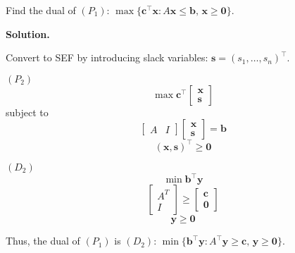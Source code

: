 \begin{exbox}
    \begin{example}[Dual]
        Find the dual of
        $ (P_1)$: $\max \{\bm{c}^\top \bm{x}: A \bm{x}\leqslant \bm{b},\,\bm{x}\geqslant  \bm{0}\}$.

        \textbf{Solution.}

        Convert to SEF by introducing slack variables: $ \bm{s}=(s_1,\ldots,s_n)^\top $.

        $ (P_2) $
        \[ \max \bm{c}^\top
            \begin{bmatrix}
                \bm{x} \\
                \bm{s}
            \end{bmatrix} \]
        subject to
        \[ \left[ \begin{array}{c|c}
                    A & I
                \end{array} \right]
            \begin{bmatrix}
                \bm{x} \\
                \bm{s}
            \end{bmatrix} = \bm{b} \]
        \[ (\bm{x},\bm{s})^\top\geqslant  \bm{0} \]

        $ (D_2) $
        \[ \min \bm{b}^\top \bm{y} \]
        \[ \begin{bmatrix}
                A^T \\
                I
            \end{bmatrix} \geqslant
            \begin{bmatrix}
                \bm{c} \\
                \bm{0}
            \end{bmatrix}\]
        \[ \bm{y}\geqslant  \bm{0} \]

        Thus, the dual of $ (P_1) $ is $ (D_2) $:
        $\min\{\bm{b}^\top \bm{y}: A ^\top \bm{y}\geqslant  \bm{c},\,\bm{y}\geqslant  \bm{0}\}$.

    \end{example}
\end{exbox}
